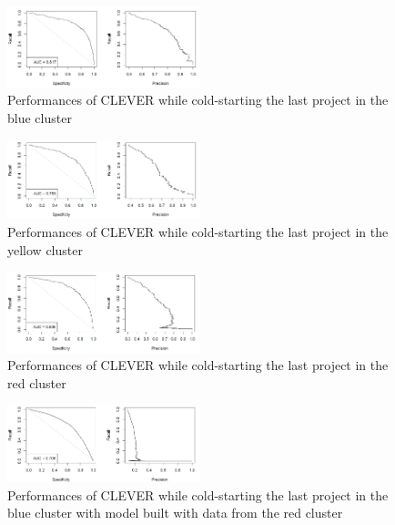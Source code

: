 \begin{figure}
  \centering
    \includegraphics[width=0.5\textwidth]{media/chap7/bluecluster.png}
    \caption{Performances of CLEVER while cold-starting the last project in the blue cluster\label{fig:bluecluster}}
\end{figure}

\begin{figure}
  \centering
    \includegraphics[width=0.5\textwidth]{media/chap7/yellowcluster.png}
    \caption{Performances of CLEVER while cold-starting the last project in the yellow cluster\label{fig:yellowcluster}}
\end{figure}


\begin{figure}
  \centering
    \includegraphics[width=0.5\textwidth]{media/chap7/redcluster.png}
    \caption{Performances of CLEVER while cold-starting the last project in the red cluster\label{fig:redcluster}}
\end{figure}

\begin{figure}
  \centering
    \includegraphics[width=0.5\textwidth]{media/chap7/redonblue.png}
    \caption{Performances of CLEVER while cold-starting the last project in the blue cluster with model built with data from the red cluster\label{fig:redonblue}}
\end{figure}